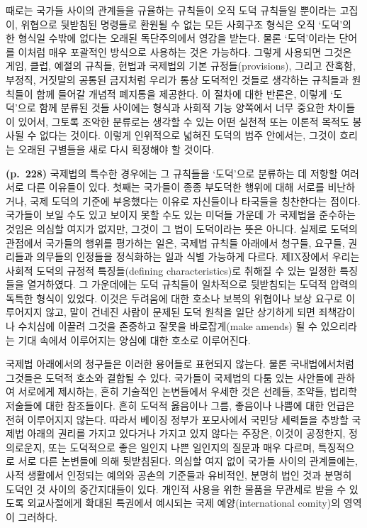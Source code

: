 때로는 국가들 사이의 관계들을 규율하는 규칙들이 오직 도덕 규칙들일
뿐이라는 고집이, 위협으로 뒷받침된 명령들로 환원될 수 없는 모든 사회구조
형식은 오직 ‘도덕’의 한 형식일 수밖에 없다는 오래된 독단주의에서 영감을
받는다. 물론 ‘도덕’이라는 단어를 이처럼 매우 포괄적인 방식으로 사용하는
것은 가능하다. 그렇게 사용되면 그것은 게임, 클럽, 예절의 규칙들, 헌법과
국제법의 기본 규정들(provisions), 그리고 잔혹함, 부정직, 거짓말의 공통된
금지처럼 우리가 통상 도덕적인 것들로 생각하는 규칙들과 원칙들이 함께
들어갈 개념적 폐지통을 제공한다. 이 절차에 대한 반론은, 이렇게
‘도덕’으로 함께 분류된 것들 사이에는 형식과 사회적 기능 양쪽에서 너무
중요한 차이들이 있어서, 그토록 조악한 분류로는 생각할 수 있는 어떤
실천적 또는 이론적 목적도 봉사될 수 없다는 것이다. 이렇게 인위적으로
넓혀진 도덕의 범주 안에서는, 그것이 흐리는 오래된 구별들을 새로 다시
획정해야 할 것이다.

\textbf{(p.~228)} 국제법의 특수한 경우에는 그 규칙들을 ‘도덕’으로
분류하는 데 저항할 여러 서로 다른 이유들이 있다. 첫째는 국가들이 종종
부도덕한 행위에 대해 서로를 비난하거나, 국제 도덕의 기준에 부응했다는
이유로 자신들이나 타국들을 칭찬한다는 점이다. 국가들이 보일 수도 있고
보이지 못할 수도 있는 미덕들 가운데 가 국제법을 준수하는
것임은 의심할 여지가 없지만, 그것이 그 법이 도덕이라는 뜻은 아니다.
실제로 도덕의 관점에서 국가들의 행위를 평가하는 일은, 국제법 규칙들
아래에서 청구들, 요구들, 권리들과 의무들의 인정들을 정식화하는 일과 식별
가능하게 다르다. 제IX장에서 우리는 사회적 도덕의 규정적 특징들(defining
characteristics)로 취해질 수 있는 일정한 특징들을 열거하였다. 그
가운데에는 도덕 규칙들이 일차적으로 뒷받침되는 도덕적 압력의 독특한
형식이 있었다. 이것은 두려움에 대한 호소나 보복의 위협이나 보상 요구로
이루어지지 않고, 말이 건네진 사람이 문제된 도덕 원칙을 일단 상기하게
되면 죄책감이나 수치심에 이끌려 그것을 존중하고 잘못을 바로잡게(make
amends) 될 수 있으리라는 기대 속에서 이루어지는 양심에 대한 호소로
이루어진다.

국제법 아래에서의 청구들은 이러한 용어들로 표현되지 않는다. 물론
국내법에서처럼 그것들은 도덕적 호소와 결합될 수 있다. 국가들이 국제법의
다툼 있는 사안들에 관하여 서로에게 제시하는, 흔히 기술적인 논변들에서
우세한 것은 선례들, 조약들, 법리학 저술들에 대한 참조들이다. 흔히 도덕적
옳음이나 그름, 좋음이나 나쁨에 대한 언급은 전혀 이루어지지 않는다.
따라서 베이징 정부가 포모사에서 국민당 세력들을 추방할 국제법 아래의
권리를 가지고 있다거나 가지고 있지 않다는 주장은, 이것이 공정한지,
정의로운지, 또는 도덕적으로 좋은 일인지 나쁜 일인지의 질문과 매우
다르며, 특징적으로 서로 다른 논변들에 의해 뒷받침된다. 의심할 여지 없이
국가들 사이의 관계들에는, 사적 생활에서 인정되는 예의와 공손의 기준들과
유비적인, 분명히 법인 것과 분명히 도덕인 것 사이의 중간지대들이 있다.
개인적 사용을 위한 물품을 무관세로 받을 수 있도록 외교사절에게 확대된
특권에서 예시되는 국제 예양(international comity)의 영역이 그러하다.

